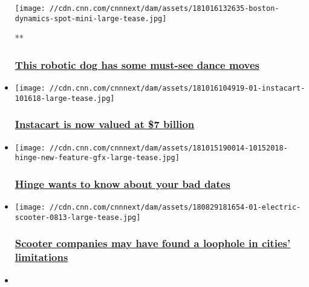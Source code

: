 \begin{itemize}
  \texttt{[image: //cdn.cnn.com/cnnnext/dam/assets/181016132635-boston-dynamics-spot-mini-large-tease.jpg]}

  **

  \hypertarget{this-robotic-dog-has-some-must-see-dance-moves}{%
  \subsubsection{\texorpdfstring{\href{/videos/business/2018/10/16/robot-dog-spot-dancing.cnn-business}{This
  robotic dog has some must-see dance
  moves}}{This robotic dog has some must-see dance moves}}\label{this-robotic-dog-has-some-must-see-dance-moves}}
\item
  \href{/2018/10/16/tech/instacart-funding/index.html}{}

  \texttt{[image: //cdn.cnn.com/cnnnext/dam/assets/181016104919-01-instacart-101618-large-tease.jpg]}

  \hypertarget{instacart-is-now-valued-at-7-billion-}{%
  \subsubsection{\texorpdfstring{\href{/2018/10/16/tech/instacart-funding/index.html}{Instacart
  is now valued at \$7 billion
  }}{Instacart is now valued at \$7 billion }}\label{instacart-is-now-valued-at-7-billion-}}
\item
  \href{/2018/10/16/tech/hinge-offline-behavior/index.html}{}

  \texttt{[image: //cdn.cnn.com/cnnnext/dam/assets/181015190014-10152018-hinge-new-feature-gfx-large-tease.jpg]}

  \hypertarget{hinge-wants-to-know-about-your-bad-dates}{%
  \subsubsection{\texorpdfstring{\href{/2018/10/16/tech/hinge-offline-behavior/index.html}{Hinge
  wants to know about your bad
  dates}}{Hinge wants to know about your bad dates}}\label{hinge-wants-to-know-about-your-bad-dates}}
\item
  \href{/2018/10/12/tech/scooter-rentals/index.html}{}

  \texttt{[image: //cdn.cnn.com/cnnnext/dam/assets/180829181654-01-electric-scooter-0813-large-tease.jpg]}

  \hypertarget{scooter-companies-may-have-found-a-loophole-in-cities-limitations}{%
  \subsubsection{\texorpdfstring{\href{/2018/10/12/tech/scooter-rentals/index.html}{Scooter
  companies may have found a loophole in cities'
  limitations}}{Scooter companies may have found a loophole in cities' limitations}}\label{scooter-companies-may-have-found-a-loophole-in-cities-limitations}}
\item
  \href{/videos/business/2018/10/15/electric-scooters-regulation-cities-sharing-orig.cnn-business}{}


\end{itemize}
